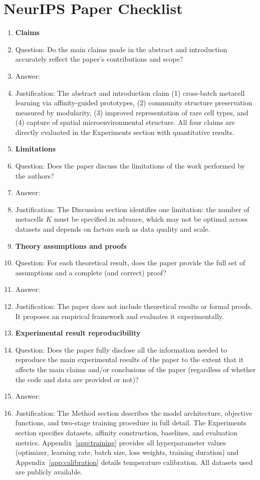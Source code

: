 \section*{NeurIPS Paper Checklist}

\begin{enumerate}

\item {\bf Claims}
    \item[] Question: Do the main claims made in the abstract and introduction accurately reflect the paper's contributions and scope?
    \item[] Answer: \answerYes{}
    \item[] Justification: The abstract and introduction claim (1) cross-batch metacell learning via affinity-guided prototypes, (2) community structure preservation measured by modularity, (3) improved representation of rare cell types, and (4) capture of spatial microenvironmental structure. All four claims are directly evaluated in the Experiments section with quantitative results.

\item {\bf Limitations}
    \item[] Question: Does the paper discuss the limitations of the work performed by the authors?
    \item[] Answer: \answerYes{}
    \item[] Justification: The Discussion section identifies one limitation: the number of metacells $K$ must be specified in advance, which may not be optimal across datasets and depends on factors such as data quality and scale.

\item {\bf Theory assumptions and proofs}
    \item[] Question: For each theoretical result, does the paper provide the full set of assumptions and a complete (and correct) proof?
    \item[] Answer: \answerNA{}
    \item[] Justification: The paper does not include theoretical results or formal proofs. It proposes an empirical framework and evaluates it experimentally.

\item {\bf Experimental result reproducibility}
    \item[] Question: Does the paper fully disclose all the information needed to reproduce the main experimental results of the paper to the extent that it affects the main claims and/or conclusions of the paper (regardless of whether the code and data are provided or not)?
    \item[] Answer: \answerYes{}
    \item[] Justification: The Method section describes the model architecture, objective functions, and two-stage training procedure in full detail. The Experiments section specifies datasets, affinity construction, baselines, and evaluation metrics. Appendix~\ref{app:training} provides all hyperparameter values (optimizer, learning rate, batch size, loss weights, training duration) and Appendix~\ref{app:calibration} details temperature calibration. All datasets used are publicly available.


\end{enumerate}
